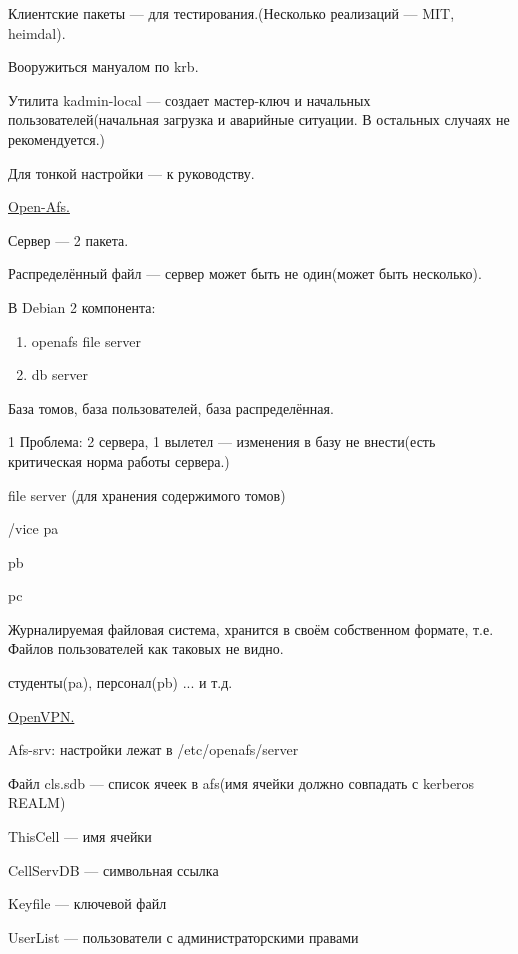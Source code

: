 \par 
Клиентские пакеты — для тестирования.(Несколько
реализаций — MIT, heimdal).
\par 
Вооружиться мануалом по krb.
\par 
Утилита kadmin-local — создает мастер-ключ
и начальных пользователей(начальная
загрузка и аварийные ситуации. В остальных
случаях не рекомендуется.)
\par 
Для тонкой настройки — к руководству.
\par 


\par 
\underline{Open-Afs.}
\par 
Сервер — 2 пакета.
\par 
Распределённый файл — сервер может
быть не один(может быть несколько).
\par 
В Debian 2 компонента:
\begin{enumerate}
	\item \par 
	openafs file server
	\item \par 
	db server
\end{enumerate}
\par 
База томов, база пользователей, база
распределённая.
\par 
1 Проблема: 2 сервера, 1 вылетел — изменения
в базу не внести(есть критическая норма
работы сервера.)
\par 
file server (для хранения содержимого томов)
\par 
/vice pa
\par 
  pb
\par 
  pc
\par 
Журналируемая файловая система, хранится
в своём собственном формате, т.е. Файлов
пользователей как таковых не видно.
\par 
студенты(pa), персонал(pb) ... и т.д.
\par 
\underline{OpenVPN.}
\par 
Afs-srv: настройки лежат в /etc/openafs/server
\par 
Файл cls.sdb — список ячеек в afs(имя ячейки
должно совпадать с kerberos REALM)
\par 
ThisCell — имя ячейки
\par 
CellServDB — символьная ссылка
\par 
Keyfile — ключевой файл
\par 
UserList — пользователи с администраторскими
правами
\par 
